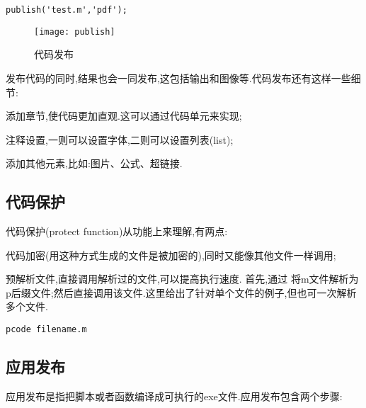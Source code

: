 \vspace{-0.8cm}
\begin{lstlisting}[caption = 代码发布]
publish('test.m','pdf');
\end{lstlisting}

\begin{figure}[htbp]
  \texttt{[image: publish]}
  \caption{代码发布}
\end{figure}

发布代码的同时,结果也会一同发布,这包括输出和图像等.代码发布还有这样一些细节:
\begindot
  \item 添加章节,使代码更加直观.这可以通过代码单元来实现;
  \item 注释设置,一则可以设置字体,二则可以设置列表(list);
  \item 添加其他元素,比如:图片、公式、超链接.
\myenddot




\subsection{代码保护}
代码保护(protect function)从功能上来理解,有两点:
\begindot
  \item 代码加密(用这种方式生成的文件是被加密的),同时又能像其他文件一样调用;
  \item 预解析文件,直接调用解析过的文件,可以提高执行速度.
\myenddot
首先,通过  将m文件解析为p后缀文件;然后直接调用该文件.这里给出了针对单个文件的例子,但也可一次解析多个文件.

\vspace{-0.8cm}
\begin{lstlisting}[caption = 代码保护]
pcode filename.m
\end{lstlisting}




\subsection{应用发布}
 应用发布是指把脚本或者函数编译成可执行的exe文件.应用发布包含两个步骤:

